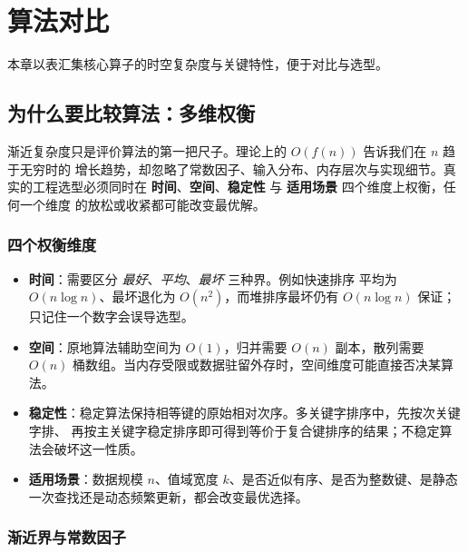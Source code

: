 \clearpage
\begingroup
\let\clearpage\relax
\let\cleardoublepage\relax
\vspace*{\fill}
\chapter{算法对比}
\begin{center}
本章以表汇集核心算子的时空复杂度与关键特性，便于对比与选型。
\end{center}
\vspace*{\fill}
\endgroup
\clearpage


\section{为什么要比较算法：多维权衡}

渐近复杂度只是评价算法的第一把尺子。理论上的 $O(f(n))$ 告诉我们在 $n$ 趋于无穷时的
增长趋势，却忽略了常数因子、输入分布、内存层次与实现细节。真实的工程选型必须同时在
\textbf{时间}、\textbf{空间}、\textbf{稳定性} 与 \textbf{适用场景} 四个维度上权衡，任何一个维度
的放松或收紧都可能改变最优解。

\subsection{四个权衡维度}

\begin{itemize}
    \item \textbf{时间}：需要区分 \emph{最好}、\emph{平均}、\emph{最坏} 三种界。例如快速排序
          平均为 $O(n\log n)$、最坏退化为 $O(n^2)$，而堆排序最坏仍有 $O(n\log n)$ 保证；
          只记住一个数字会误导选型。
    \item \textbf{空间}：原地算法辅助空间为 $O(1)$，归并需要 $O(n)$ 副本，散列需要 $O(n)$
          桶数组。当内存受限或数据驻留外存时，空间维度可能直接否决某算法。
    \item \textbf{稳定性}：稳定算法保持相等键的原始相对次序。多关键字排序中，先按次关键字排、
          再按主关键字稳定排序即可得到等价于复合键排序的结果；不稳定算法会破坏这一性质。
    \item \textbf{适用场景}：数据规模 $n$、值域宽度 $k$、是否近似有序、是否为整数键、是静态
          一次查找还是动态频繁更新，都会改变最优选择。
\end{itemize}

\subsection{渐近界与常数因子}

